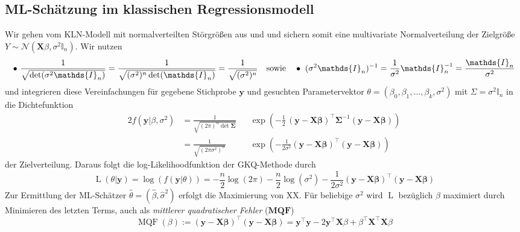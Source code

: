 \subsection{ML-Schätzung im klassischen Regressionsmodell}

Wir gehen vom KLN-Modell mit normalverteilten Störgrößen aus und und sichern somit eine multivariate Normalverteilung 
der Zielgröße $Y \sim \mathcal{N}(\mathbf{X} \beta ,\sigma^2 \mathds{I}_{n})$. Wir nutzen
\begin{equation*}
    \bullet ~ \frac{1}{\sqrt{\det(\sigma^2 \mathds{I}_{n})} }= \frac{1}{\sqrt{(\sigma^{2})^n \det(\mathds{I}_{n})}}  = \frac{1}{\sqrt{(\sigma^{2})^n} } \\
    \quad \text{sowie} \quad \bullet ~ (\sigma^2 \mathds{I}_{n})^{-1} = \frac{1}{\sigma^2} \mathds{I}_{n}^{-1} = \frac{\mathds{I}_{n}}{\sigma^2}
\end{equation*}
und integrieren diese Vereinfachungen für gegebene Stichprobe $\mathbf{y}$ und gesuchten
Parametervektor $\theta=(\beta_{0},\beta_{1},\ldots,\beta_{k},\sigma^{2})$ mit 
$\Sigma=\sigma^2 \mathds{I}_{n}$ in die Dichtefunktion
\begin{alignat*}{2}
    f(\mathbf{y}|\beta,\sigma^2) & = \frac{1}{ \sqrt{(2 \pi)^{n} \det \mathbf{\Sigma} } } 
    &&\exp \left( -\frac{1}{2 } \, \left(\mathbf{y-X\beta} \right)^{\top} \mathbf{\Sigma}^{-1} \left( \mathbf{y-X\beta} \right) \right)\\
    & =\frac{1}{ \sqrt{(2 \pi  \sigma^2)^n } } 
    &&\exp \left(-\frac{1}{2 \sigma^2} \left( \mathbf{y-X\beta} \right)^{\top} \left( \mathbf{y-X\beta} \right) \right)
\end{alignat*}
der Zielverteilung. Daraus folgt die log-Likelihoodfunktion der GKQ-Methode durch
\begin{equation*}
    \operatorname{L}(\theta|\mathbf{y})=\log \left( f(\mathbf{y}|\theta) \right)= -\frac{n}{2} \operatorname{log}(2\pi) -\frac{n}{2} \operatorname{log}(\sigma^{2})
    -\frac{1}{2\sigma^{2}} \left( \mathbf{y-X\beta} \right)^{\top} \left( \mathbf{y-X\beta} \right)
\end{equation*}
Zur Ermittlung der ML-Schätzer $\hat{\theta}=(\hat{\beta},\hat{\sigma}^2)$ erfolgt die Maximierung von XX. 
Für beliebige $\sigma^2$ wird $\operatorname{L}$ bezüglich $\beta$ maximiert 
durch Minimieren des letzten Terms, auch als \emph{mittlerer quadratischer Fehler} ($\mathbf{MQF}$)
\begin{equation} \label{eq-6.21:mqf-beta}
    \operatorname{MQF}(\beta):=\left( \mathbf{y-X\beta} \right)^{\top} \left( \mathbf{y-X\beta} \right)=
    \mathbf{y}^{\top} \mathbf{y} -2 \mathbf{y}^{\top} \mathbf{X} \beta + \beta^{\top} \mathbf{X}^{\top} \mathbf{X} \beta
\end{equation}
